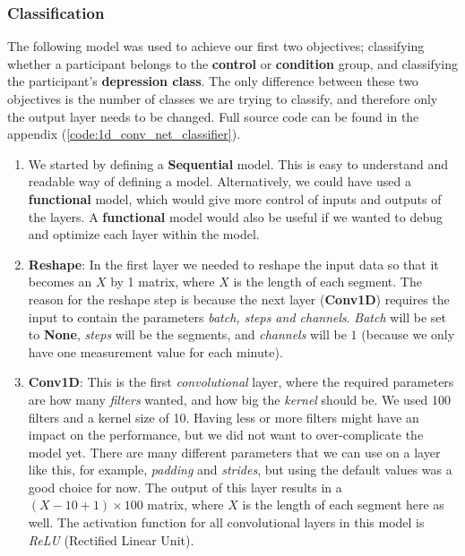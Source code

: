 \subsubsection{Classification}
The following model was used to achieve our first two objectives; classifying whether a participant belongs to the \textbf{control} or \textbf{condition} group, and classifying the participant's \textbf{depression class}. The only difference between these two objectives is the number of classes we are trying to classify, and therefore only the output layer needs to be changed. Full source code can be found in the appendix (\ref{code:1d_conv_net_classifier}).

\begin{enumerate}
      \item We started by defining a \textbf{Sequential} model. This is easy to understand and readable way of defining a model. Alternatively, we could have used a \textbf{functional} model, which would give more control of inputs and outputs of the layers. A \textbf{functional} model would also be useful if we wanted to debug and optimize each layer within the model. 
      
      \item \textbf{Reshape}: In the first layer we needed to reshape the input data so that it becomes an $X$ by 1 matrix, where $X$ is the length of each segment. The reason for the reshape step is because the next layer (\textbf{Conv1D}) requires the input to contain the parameters \textit{batch, steps and channels}. \textit{Batch} will be set to \textbf{None}, \textit{steps} will be the segments, and \textit{channels} will be $1$ (because we only have one measurement value for each minute).
      
      \item \textbf{Conv1D}: This is the first \textit{convolutional} layer, where the required parameters are how many \textit{filters} wanted, and how big the \textit{kernel} should be. We used 100 filters and a kernel size of 10. Having less or more filters might have an impact on the performance, but we did not want to over-complicate the model yet. There are many different parameters that we can use on a layer like this, for example, \textit{padding} and \textit{strides}, but using the default values was a good choice for now. The output of this layer results in a $(X-10+1) \times 100$ matrix, where $X$ is the length of each segment here as well. The activation function for all convolutional layers in this model is \textit{ReLU} (Rectified Linear Unit). 


\end{enumerate}
